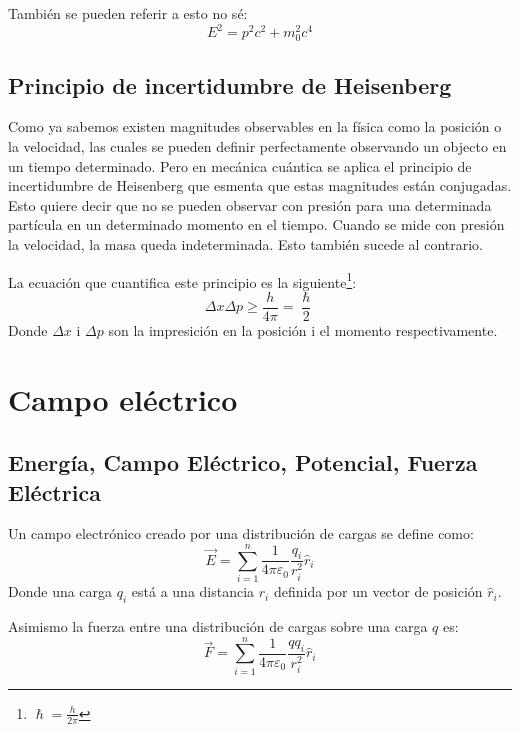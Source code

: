 \documentclass[arial,a4paper,print]{article}
\begin{document}
También se pueden referir a esto no sé:
\begin{equation*}
	E^{2} = p^{2}c^{2} + m_{0}^{2}c^{4}
\end{equation*}

\subsection{Principio de incertidumbre de Heisenberg}
Como ya sabemos existen magnitudes observables en la física como la posición o la velocidad, las cuales se pueden definir perfectamente observando un objecto en un tiempo determinado. Pero en mecánica cuántica se aplica el principio de incertidumbre de Heisenberg que esmenta que estas magnitudes están conjugadas. Esto quiere decir que no se pueden observar con presión para una determinada partícula en un determinado momento en el tiempo. Cuando se mide con presión la velocidad, la masa queda indeterminada. Esto también sucede al contrario. 

La ecuación que cuantifica este principio es la siguiente\footnote{$\hslash = \frac{h}{2\pi}$}:
\begin{equation*}
	\Delta x\Delta p \geq \frac{h}{4\pi} = \frac{\hslash}{2}
\end{equation*}
Donde $\Delta x$ i $\Delta p$ son la impresición en la posición i el momento respectivamente.

\pagebreak
\section{Campo eléctrico}

\subsection{Energía, Campo Eléctrico, Potencial, Fuerza Eléctrica}
Un campo electrónico creado por una distribución de cargas se define como:
\begin{equation*}
	\overrightarrow{E} = \sum^{n}_{i=1}\frac{1}{4\pi\varepsilon_{0}}\frac{q_{i}}{r^{2}_{i}}\hat{r}_{i}
\end{equation*} 
Donde una carga $q_{i}$ está a una distancia $r_{i}$ definida por un vector de posición $\hat{r}_{i}$.

Asimismo la fuerza entre una distribución de cargas sobre una carga $q$ es:
\begin{equation*}
	\overrightarrow{F} = \sum_{i=1}^{n}\frac{1}{4\pi\varepsilon_{0}}\frac{qq_{i}}{r^{2}_{i}}\hat{r}_{i}
\end{equation*}
\end{document}

